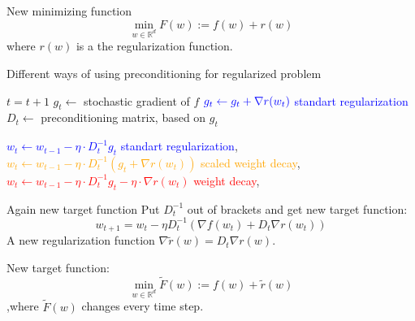 \documentclass[aspectratio=169, 12pt]{beamer}
\begin{document}
\begin{frame}[shrink]{New minimizing function}
\begin{equation*}
        \min_{w \in \mathbb{R}^d} F(w) := f(w) + r(w)
\end{equation*}
where $r(w)$ is a the regularization function.

\begin{algorithm}[H]
    \caption{Different ways of using preconditioning for regularized problem}
    \label{alg:precond}
    
    \begin{algorithmic}
            
            \State $t = t+1$
            \State $g_t \gets$ stochastic gradient of $f$
            \State $\textcolor{blue}{g_t \gets g_t + \nabla r(w_t)}$ \hfill \textcolor{blue}{standart regularization}
            \State $D_t \gets$ preconditioning matrix, based on $g_t$

            \State \textcolor{blue}{$w_t \gets w_{t-1} - \eta \cdot D_t^{-1}g_t $} \hfill \textcolor{blue}{standart regularization}, 
            \State \textcolor{orange}{$w_t \gets w_{t-1} - \eta \cdot D_t^{-1} \left(g_t +\nabla r(w_t) \right)$} \hfill \textcolor{orange}{scaled weight decay}, 
            \State \textcolor{red}{$w_t \gets w_{t-1} - \eta \cdot D_t^{-1} g_t  - \eta \cdot \nabla r(w_t)$} \hfill \textcolor{red}{weight decay}, 
            \EndWhile
    \end{algorithmic}
\end{algorithm}

\end{frame}

\begin{frame}{Again new target function}
Put $D_t^{-1}$ out of brackets and get new target function:
\begin{equation*}
    w_{t+1} = w_t - \eta D_t^{-1}(\nabla f(w_t) + D_t \nabla r(w_t))
\end{equation*}
A new regularization function $\nabla \tilde{r}(w) = D_t \nabla r(w)$.


New target function:
\begin{equation*}
    \min_{w \in \mathbb{R}^d} \tilde{F}(w) := f(w) + \tilde{r}(w)
\end{equation*}
,where $\tilde{F}(w)$ changes every time step.
\end{frame}
\end{document}
